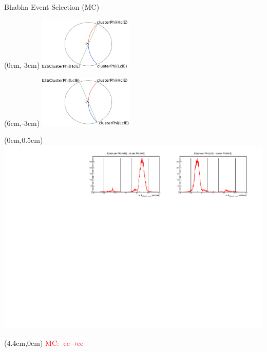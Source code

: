 \documentclass[10pt]{beamer}
\begin{document}
\begin{frame}{Bhabha Event Selection (MC)}	
	
		\begin{textblock*}{0.5\textwidth}(0cm,-3cm)
		\centering
		\includegraphics[width=4.5cm]{Plots/b2b_2}
	\end{textblock*}
	
	\begin{textblock*}{0.5\textwidth}(6cm,-3cm)
		\centering
		\includegraphics[width=4.5cm]{Plots/b2b_3}
	\end{textblock*}
	

		\begin{textblock*}{1\textwidth}(0cm,0.5cm)
		\centering
		\includegraphics[width=\textwidth]{Plots/Eff/b2b_MC.pdf}
	\end{textblock*}







	\begin{textblock*}{0.3\textwidth}(4.4cm,0cm)
		\textcolor{red}{MC: $\textrm{ee} \rightarrow \textrm{ee}$}
	\end{textblock*}





\end{frame}
\end{document}
